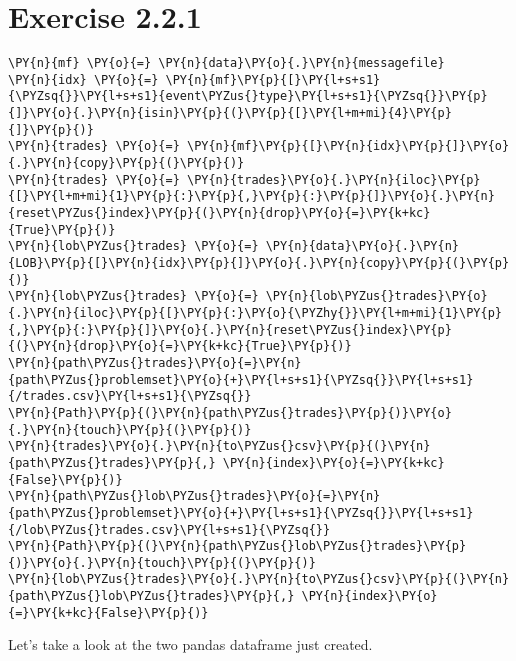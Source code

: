 \documentclass[9pt]{article}
\begin{document}
    \hypertarget{exercise-2.2.1}{%
\section*{Exercise 2.2.1}\label{exercise-2.2.1}}

    \begin{tcolorbox}[breakable, size=fbox, boxrule=1pt, pad at break*=1mm,colback=cellbackground, colframe=cellborder]
\begin{Verbatim}[commandchars=\\\{\}]
\PY{n}{mf} \PY{o}{=} \PY{n}{data}\PY{o}{.}\PY{n}{messagefile}
\PY{n}{idx} \PY{o}{=} \PY{n}{mf}\PY{p}{[}\PY{l+s+s1}{\PYZsq{}}\PY{l+s+s1}{event\PYZus{}type}\PY{l+s+s1}{\PYZsq{}}\PY{p}{]}\PY{o}{.}\PY{n}{isin}\PY{p}{(}\PY{p}{[}\PY{l+m+mi}{4}\PY{p}{]}\PY{p}{)}
\PY{n}{trades} \PY{o}{=} \PY{n}{mf}\PY{p}{[}\PY{n}{idx}\PY{p}{]}\PY{o}{.}\PY{n}{copy}\PY{p}{(}\PY{p}{)}
\PY{n}{trades} \PY{o}{=} \PY{n}{trades}\PY{o}{.}\PY{n}{iloc}\PY{p}{[}\PY{l+m+mi}{1}\PY{p}{:}\PY{p}{,}\PY{p}{:}\PY{p}{]}\PY{o}{.}\PY{n}{reset\PYZus{}index}\PY{p}{(}\PY{n}{drop}\PY{o}{=}\PY{k+kc}{True}\PY{p}{)}
\PY{n}{lob\PYZus{}trades} \PY{o}{=} \PY{n}{data}\PY{o}{.}\PY{n}{LOB}\PY{p}{[}\PY{n}{idx}\PY{p}{]}\PY{o}{.}\PY{n}{copy}\PY{p}{(}\PY{p}{)}
\PY{n}{lob\PYZus{}trades} \PY{o}{=} \PY{n}{lob\PYZus{}trades}\PY{o}{.}\PY{n}{iloc}\PY{p}{[}\PY{p}{:}\PY{o}{\PYZhy{}}\PY{l+m+mi}{1}\PY{p}{,}\PY{p}{:}\PY{p}{]}\PY{o}{.}\PY{n}{reset\PYZus{}index}\PY{p}{(}\PY{n}{drop}\PY{o}{=}\PY{k+kc}{True}\PY{p}{)}
\PY{n}{path\PYZus{}trades}\PY{o}{=}\PY{n}{path\PYZus{}problemset}\PY{o}{+}\PY{l+s+s1}{\PYZsq{}}\PY{l+s+s1}{/trades.csv}\PY{l+s+s1}{\PYZsq{}}
\PY{n}{Path}\PY{p}{(}\PY{n}{path\PYZus{}trades}\PY{p}{)}\PY{o}{.}\PY{n}{touch}\PY{p}{(}\PY{p}{)}
\PY{n}{trades}\PY{o}{.}\PY{n}{to\PYZus{}csv}\PY{p}{(}\PY{n}{path\PYZus{}trades}\PY{p}{,} \PY{n}{index}\PY{o}{=}\PY{k+kc}{False}\PY{p}{)}
\PY{n}{path\PYZus{}lob\PYZus{}trades}\PY{o}{=}\PY{n}{path\PYZus{}problemset}\PY{o}{+}\PY{l+s+s1}{\PYZsq{}}\PY{l+s+s1}{/lob\PYZus{}trades.csv}\PY{l+s+s1}{\PYZsq{}}
\PY{n}{Path}\PY{p}{(}\PY{n}{path\PYZus{}lob\PYZus{}trades}\PY{p}{)}\PY{o}{.}\PY{n}{touch}\PY{p}{(}\PY{p}{)}
\PY{n}{lob\PYZus{}trades}\PY{o}{.}\PY{n}{to\PYZus{}csv}\PY{p}{(}\PY{n}{path\PYZus{}lob\PYZus{}trades}\PY{p}{,} \PY{n}{index}\PY{o}{=}\PY{k+kc}{False}\PY{p}{)}
\end{Verbatim}
\end{tcolorbox}

    Let's take a look at the two pandas dataframe just created.
\end{document}
